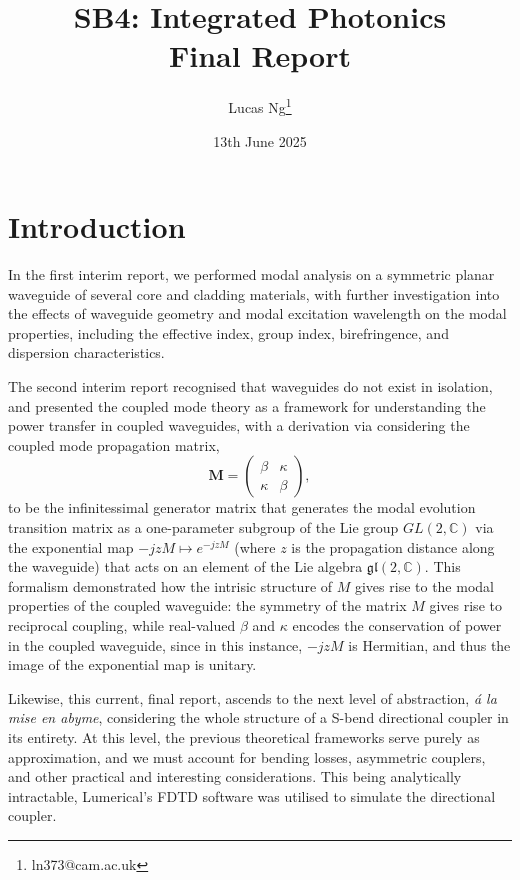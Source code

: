 \documentclass[10pt, a4paper]{article}
\title{\Large \bfseries SB4: Integrated Photonics\\[0.5em] \large Final Report}
\author{Lucas Ng\thanks{ln373@cam.ac.uk}}
\date{13th June 2025}
\begin{document}
\maketitle

\section{Introduction}

In the first interim report, we performed modal analysis on a symmetric planar waveguide
of several core and cladding materials, with further investigation into the effects of waveguide geometry and modal excitation wavelength on the modal properties,
including the effective index, group index, birefringence, and dispersion characteristics.

The second interim report recognised that waveguides do not exist in isolation,
and presented the coupled mode theory as a framework for understanding the power transfer in coupled waveguides,
with a derivation via considering the coupled mode propagation matrix,
\[
\mathbf{M} = \begin{pmatrix}
\beta & \kappa \\
\kappa & \beta
\end{pmatrix},
\]
to be the infinitessimal generator matrix that generates the modal evolution transition matrix as 
a one-parameter subgroup of the Lie group \(GL(2, \mathbb{C})\)
via the exponential map \(-jzM\mapsto e^{-jzM}\) (where \(z\) is the propagation distance along the waveguide)
that acts on an element of the Lie algebra \(\mathfrak{gl}(2, \mathbb{C})\).
This formalism demonstrated how the intrisic structure of \(M\) gives rise to the modal properties of the coupled waveguide:
the symmetry of the matrix \(M\) gives rise to reciprocal coupling,
while real-valued \(\beta\) and \(\kappa\) encodes the conservation of power in the coupled waveguide,
since in this instance, \(-jzM\) is Hermitian, and thus the image of the exponential map is unitary.

Likewise, this current, final report, ascends to the next level of abstraction,
\textit{\'a la mise en abyme},
considering the whole structure of a S-bend directional coupler in its entirety.
At this level, the previous theoretical frameworks serve purely as approximation,
and we must account for bending losses, asymmetric couplers, and other practical and interesting considerations.
This being analytically intractable, Lumerical's FDTD software\autocite{lumerical_fdtd} was utilised to simulate the directional coupler.
\end{document}
